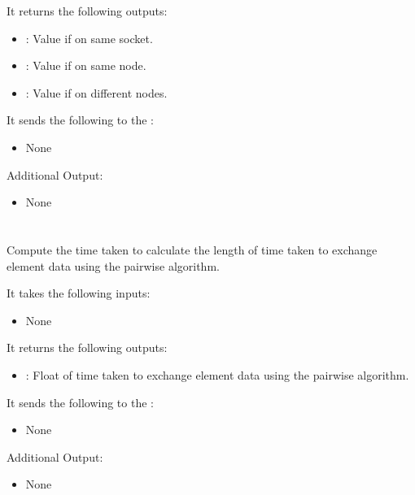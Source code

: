 It returns the following outputs:

\begin{itemize}
\item {}: Value if on same socket.
\item {}: Value if on same node.
\item {}: Value if on different nodes.
\end{itemize}

It sends the following to the :

\begin{itemize}
\item None
\end{itemize}

Additional Output:
\begin{itemize}
\item None
\end{itemize}

\section{}
Compute the time taken to calculate the length of time taken to exchange element data using the pairwise algorithm.

It takes the following inputs:

\begin{itemize}
\item None
\end{itemize}

It returns the following outputs:

\begin{itemize}
\item {}: Float of time taken to exchange element data using the pairwise algorithm.
\end{itemize}

It sends the following to the :

\begin{itemize}
\item None
\end{itemize}

Additional Output:
\begin{itemize}
\item None
\end{itemize}


